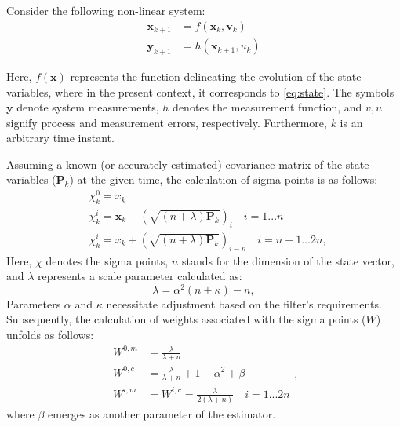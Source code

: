 Consider the following non-linear system:
\begin{equation}\begin{aligned}\boldsymbol{x}_{k+1}&=f(\boldsymbol{x}_k,\boldsymbol{v}_k)\\\boldsymbol{y}_{k+1}&=h(\boldsymbol{x}_{k+1},u_k)\end{aligned}\end{equation}
 
Here, $f(\boldsymbol{x})$ represents the function delineating the evolution of the state variables, where in the present context, it corresponds to \autoref{eq:state}. The symbols $\boldsymbol{y}$ denote system measurements, $h$ denotes the measurement function, and $v, u$ signify process and measurement errors, respectively. Furthermore, $k$ is an arbitrary time instant.

Assuming a known (or accurately estimated) covariance matrix of the state variables ($\boldsymbol{P}_k$) at the given time, the calculation of sigma points is as follows:
\begin{equation}\begin{aligned}
    &\chi_{k}^{0} =x_{k}  \\
    &\chi_{k}^{i} =\boldsymbol{x}_k+\left(\sqrt{(n+\lambda)\mathbf{P}_k}\right)_i\quad i=1...n  \\
    &\chi_{k}^{i} =x_{k}+\left(\sqrt{(n+\lambda)\mathbf{P}_{k}}\right)_{i-n}\quad i=n+1\ldots2n, 
\end{aligned}\end{equation}
Here, $\chi$ denotes the sigma points, $n$ stands for the dimension of the state vector, and $\lambda$ represents a scale parameter calculated as:
\begin{equation}
\lambda = \alpha^2(n+\kappa)-n,
\end{equation}
Parameters $\alpha$ and $\kappa$ necessitate adjustment based on the filter's requirements. Subsequently, the calculation of weights associated with the sigma points ($W$) unfolds as follows:
\begin{equation}\begin{aligned}W^{0,m}&=\frac\lambda{\lambda+n}\\W^{0,c}&=\frac\lambda{\lambda+n}+1-\alpha^2+\beta\\W^{i,m}&=W^{i,c}=\frac\lambda{2(\lambda+n)}\quad i=1...2n\end{aligned},\end{equation}
where $\beta$ emerges as another parameter of the estimator.


